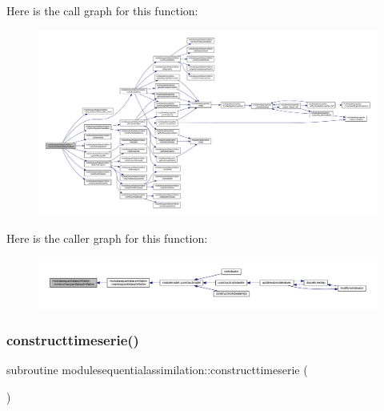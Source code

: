 Here is the call graph for this function\+:\nopagebreak
\begin{figure}[H]
\begin{center}
\leavevmode
\includegraphics[width=350pt]{namespacemodulesequentialassimilation_a3da335c8c675b830ec8be82762a0bb61_cgraph}
\end{center}
\end{figure}
Here is the caller graph for this function\+:\nopagebreak
\begin{figure}[H]
\begin{center}
\leavevmode
\includegraphics[width=350pt]{namespacemodulesequentialassimilation_a3da335c8c675b830ec8be82762a0bb61_icgraph}
\end{center}
\end{figure}
\mbox{\label{namespacemodulesequentialassimilation_a9aa173ea83e0e960fe1561e3a9f183be}} 
\subsubsection{\texorpdfstring{constructtimeserie()}{constructtimeserie()}}
{\footnotesize\ttfamily subroutine modulesequentialassimilation\+::constructtimeserie (\begin{DoxyParamCaption}{ }\end{DoxyParamCaption})\hspace{0.3cm}{\ttfamily [private]}}

